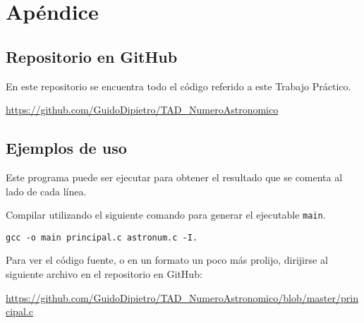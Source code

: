 \documentclass[a4paper, 12pt]{article}
\begin{document}
\newpage
\section{Apéndice} \label{apendice}

\subsection{Repositorio en GitHub} \label{github}
En este repositorio se encuentra todo el código referido a este Trabajo Práctico.

\begin{center}
\url{https://github.com/GuidoDipietro/TAD_NumeroAstronomico}
\end{center}

\subsection{Ejemplos de uso} \label{ejemplos}

Este programa puede ser ejecutar para obtener el resultado que se comenta al lado de cada línea.

Compilar utilizando el siguiente comando para generar el ejecutable \texttt{main}.

\begin{center}
    \texttt{gcc -o main principal.c astronum.c -I.}
\end{center}

Para ver el código fuente, o en un formato un poco más prolijo, dirijirse al siguiente archivo en el repositorio en GitHub:

\begin{center}
    \url{https://github.com/GuidoDipietro/TAD_NumeroAstronomico/blob/master/principal.c}
\end{center}

\bigbreak
\end{document}
